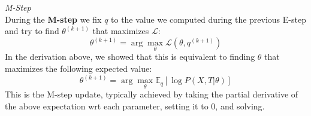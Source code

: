 \documentclass[11pt]{article}
\newenvironment{summary}[1][Summary]{
    \begin{trivlist}
    \item[\hskip \labelsep {\bfseries #1}]
}{\end{trivlist}}
\begin{document}
\begin{framed}
    \vspace{-5mm}
    \begin{summary} \textit{M-Step}\\
        During the \textbf{M-step} we fix $q$ to the value we computed during
        the previous E-step and try to find $\theta^{(k+1)}$ that maximizes
        $\mathcal{L}$:
        \begin{equation*}
            \theta^{(k+1)} = \arg \max_\theta \mathcal{L}(\theta, q^{(k+1)})
        \end{equation*}
        In the derivation above, we showed that this is equivalent to finding
        $\theta$ that maximizes the following expected value:
        \begin{equation}
            \theta^{(k+1)} = \arg \max_\theta \mathbb{E}_q[ \log P(X, T | \theta) ]
        \end{equation}
        This is the  M-step update, typically achieved by taking the partial
        derivative of the above expectation wrt each parameter, setting it to 0,
        and solving.
    \end{summary}
    \vspace{-2mm}
\end{framed}
\end{document}
